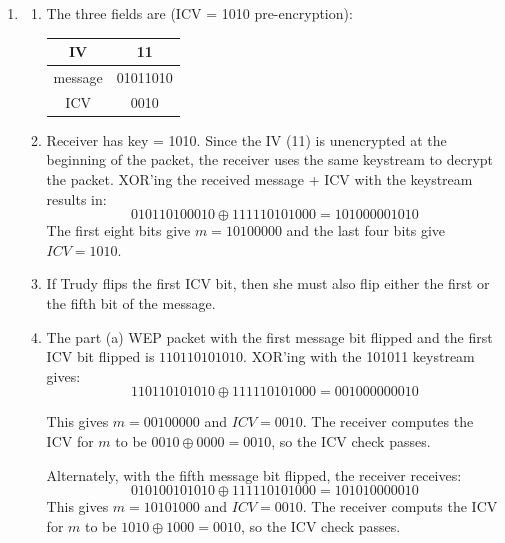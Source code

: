 \documentclass{article}
\begin{document}
\begin{enumerate}

\item
\begin{enumerate}

\item The three fields are (ICV = 1010 pre-encryption):

\begin{tabular}{|c|c|}
    \hline
    IV & 11 \\ \hline
    message & 01011010 \\ \hline
    ICV & 0010 \\ \hline
\end{tabular}

\item Receiver has key = 1010. Since the IV (11) is unencrypted at the beginning of the packet, the receiver uses the 
same keystream to decrypt the packet. XOR'ing the received message + ICV with the keystream results in:
$$ 010110100010 \oplus 111110101000 = 101000001010 $$
The first eight bits give $m = 10100000$ and the last four bits give $ICV=1010$.

\item If Trudy flips the first ICV bit, then she must also flip either the first or the fifth bit of the 
message.

\item The part (a) WEP packet with the first message bit flipped and the first ICV bit flipped is $110110101010$. 
XOR'ing with the 101011 keystream gives:
$$ 1101 1010 1010 \oplus 1111 1010 1000 = 0010 0000 0010 $$

This gives $m=0010 0000$ and $ICV=0010$. The receiver computes the ICV for $m$ to be $0010 \oplus 0000 = 0010$, 
so the ICV check passes.

Alternately, with the fifth message bit flipped, the receiver receives:
$$ 0101 0010 1010 \oplus 111110101000 = 101010000010 $$
This gives $m=1010 1000$ and $ICV=0010$. The receiver computs the ICV for $m$ to be $1010 \oplus 1000 = 0010$, so the 
ICV check passes.


\end{enumerate}
\end{enumerate}
\end{document}
